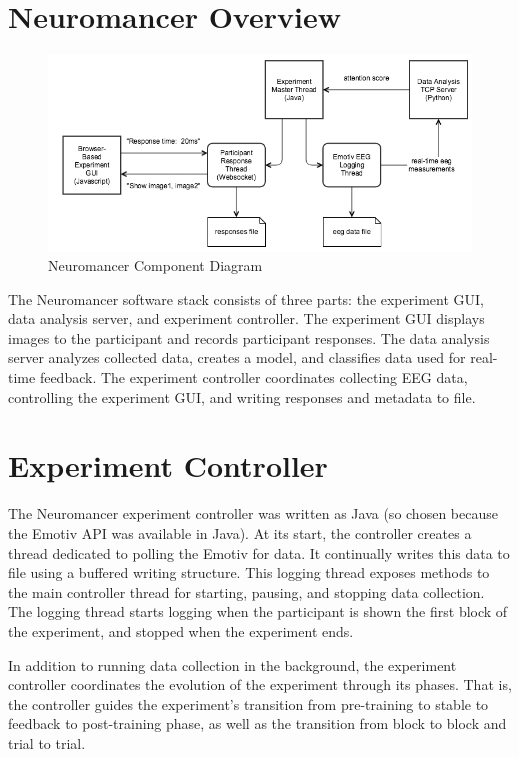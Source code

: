 \documentclass[12pt]{report}
\begin{document}
\section{Neuromancer Overview}
\begin{figure}
\centerline{
\includegraphics[width=12cm]{neuromancer_anatomy}
}
\caption{Neuromancer Component Diagram}
\end{figure}

The Neuromancer software stack consists of three parts: the experiment GUI, data analysis server, and experiment controller.  The experiment GUI displays images to the participant and records participant responses.  The data analysis server analyzes collected data, creates a model, and classifies data used for real-time feedback.  The experiment controller coordinates collecting EEG data, controlling the experiment GUI, and writing responses and metadata to file.

\section{Experiment Controller}
The Neuromancer experiment controller was written as Java (so chosen because the Emotiv API was available in Java).  At its start, the controller creates a thread dedicated to polling the Emotiv for data.  It continually writes this data to file using a buffered writing structure.  This logging thread exposes methods to the main controller thread for starting, pausing, and stopping data collection.  The logging thread starts logging when the participant is shown the first block of the experiment, and stopped when the experiment ends.
  
In addition to running data collection in the background, the experiment controller coordinates the evolution of the experiment through its phases. That is, the controller guides the experiment's transition from pre-training to stable to feedback to post-training phase, as well as the transition from block to block and trial to trial.   
\end{document}
